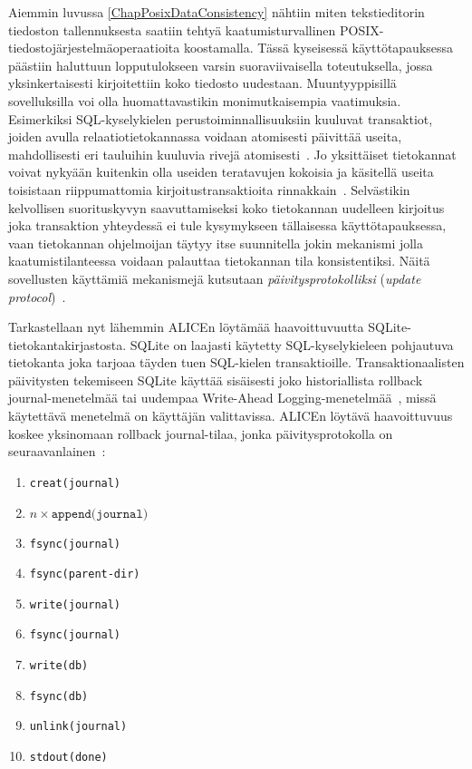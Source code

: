 Aiemmin luvussa \ref{ChapPosixDataConsistency} nähtiin miten tekstieditorin tiedoston tallennuksesta saatiin tehtyä kaatumisturvallinen POSIX-tiedostojärjestelmäoperaatioita koostamalla.
Tässä kyseisessä käyttötapauksessa päästiin haluttuun lopputulokseen varsin suoraviivaisella toteutuksella, jossa yksinkertaisesti kirjoitettiin koko tiedosto uudestaan.
Muuntyyppisillä sovelluksilla voi olla huomattavastikin monimutkaisempia vaatimuksia.
Esimerkiksi SQL-kyselykielen perustoiminnallisuuksiin kuuluvat transaktiot,
joiden avulla relaatiotietokannassa voidaan atomisesti päivittää useita, mahdollisesti eri tauluihin kuuluvia rivejä atomisesti~\cite{DatabaseFundamentals}.
Jo yksittäiset tietokannat voivat nykyään kuitenkin olla useiden teratavujen kokoisia ja käsitellä useita toisistaan riippumattomia kirjoitustransaktioita rinnakkain~\cite{DatabaseFundamentals}.
Selvästikin kelvollisen suorituskyvyn saavuttamiseksi koko tietokannan uudelleen kirjoitus joka transaktion yhteydessä ei tule kysymykseen tällaisessa käyttötapauksessa,
vaan tietokannan ohjelmoijan täytyy itse suunnitella jokin mekanismi jolla kaatumistilanteessa voidaan palauttaa tietokannan tila konsistentiksi.
Näitä sovellusten käyttämiä mekanismejä kutsutaan \emph{päivitysprotokolliksi} (\emph{update protocol})~\cite{PosixDataConsistency}.

Tarkastellaan nyt lähemmin ALICEn löytämää haavoittuvuutta SQLite-tietokantakirjastosta.
SQLite on laajasti käytetty SQL-kyselykieleen pohjautuva tietokanta joka tarjoaa täyden tuen SQL-kielen transaktioille.
Transaktionaalisten päivitysten tekemiseen SQLite käyttää sisäisesti joko historiallista rollback journal-menetelmää tai uudempaa Write-Ahead Logging-menetelmää~\cite{SqliteAnalysis},
missä käytettävä menetelmä on käyttäjän valittavissa.
ALICEn löytävä haavoittuvuus koskee yksinomaan rollback journal-tilaa,
jonka päivitysprotokolla on seuraavanlainen~\cite{PosixDataConsistency}:

\begin{enumerate}
    \item{\texttt{creat(journal)}}
    \item{$n \times \texttt{append(journal)}$}
    \item{\texttt{fsync(journal)}}
    \item{\texttt{fsync(parent-dir)}}
    \item{\texttt{write(journal)}}
    \item{\texttt{fsync(journal)}}
    \item{\texttt{write(db)}}
    \item{\texttt{fsync(db)}}
    \item{\texttt{unlink(journal)}}
    \item{\texttt{stdout(done)}}
\end{enumerate}

